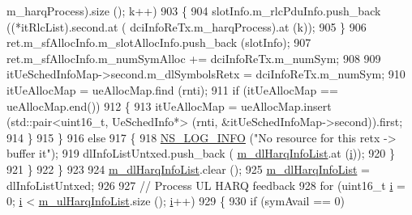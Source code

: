 \begin{DoxyCode}
      m\_harqProcess).size (); k++)
903                                         \{
904                                                 slotInfo.m\_rlcPduInfo.push\_back ((*itRlcList).second.at (
      dciInfoReTx.m\_harqProcess).at (k));
905                                         \}
906                                         ret.m\_sfAllocInfo.m\_slotAllocInfo.push\_back (slotInfo);
907                                         ret.m\_sfAllocInfo.m\_numSymAlloc += dciInfoReTx.m\_numSym;
908 
909                                         itUeSchedInfoMap->second.m\_dlSymbolsRetx = dciInfoReTx.m\_numSym;
910                                         itUeAllocMap = ueAllocMap.find (rnti);
911                                         \textcolor{keywordflow}{if} (itUeAllocMap == ueAllocMap.end())
912                                         \{
913                                                 itUeAllocMap = ueAllocMap.insert (std::pair<uint16\_t,
       UeSchedInfo*> (rnti, &itUeSchedInfoMap->second)).first;
914                                         \}
915                                 \}
916                                 \textcolor{keywordflow}{else}
917                                 \{
918                                         \hyperlink{group__logging_gafbd73ee2cf9f26b319f49086d8e860fb}{NS\_LOG\_INFO} (\textcolor{stringliteral}{"No resource for this retx -> buffer it"});
919                                         dlInfoListUntxed.push\_back (
      \hyperlink{classns3_1_1MmWaveFlexTtiMaxRateMacScheduler_a06e986195cd0656360fe3b94ac65d6ad}{m\_dlHarqInfoList}.at (\hyperlink{bernuolliDistribution_8m_a6f6ccfcf58b31cb6412107d9d5281426}{i}));
920                                 \}
921                         \}
922                 \}
923 
924                 \hyperlink{classns3_1_1MmWaveFlexTtiMaxRateMacScheduler_a06e986195cd0656360fe3b94ac65d6ad}{m\_dlHarqInfoList}.clear ();
925                 \hyperlink{classns3_1_1MmWaveFlexTtiMaxRateMacScheduler_a06e986195cd0656360fe3b94ac65d6ad}{m\_dlHarqInfoList} = dlInfoListUntxed;
926 
927                 \textcolor{comment}{// Process UL HARQ feedback}
928                 \textcolor{keywordflow}{for} (uint16\_t \hyperlink{bernuolliDistribution_8m_a6f6ccfcf58b31cb6412107d9d5281426}{i} = 0; \hyperlink{bernuolliDistribution_8m_a6f6ccfcf58b31cb6412107d9d5281426}{i} < \hyperlink{classns3_1_1MmWaveFlexTtiMaxRateMacScheduler_a686a92955acbcdcde854c36eb9aaf82d}{m\_ulHarqInfoList}.size (); 
      \hyperlink{bernuolliDistribution_8m_a6f6ccfcf58b31cb6412107d9d5281426}{i}++)
929                 \{
930                         \textcolor{keywordflow}{if} (symAvail == 0)

\end{DoxyCode}
